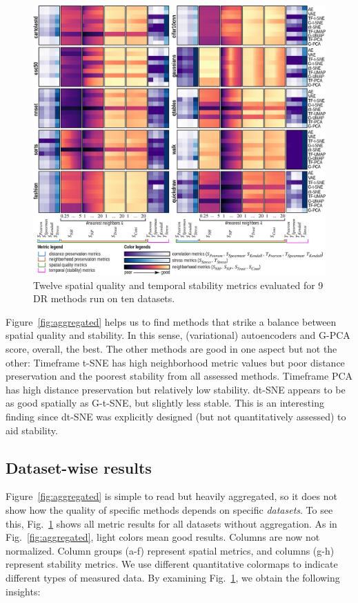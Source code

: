 \begin{figure}[tb]\centering
  \vspace{-0.2cm}
  \includegraphics[width=\linewidth]{figures/projection-evaluation/f2.eps}
  \caption{Twelve spatial quality and temporal stability metrics evaluated for 9 DR  methods run on ten datasets.}
  \vspace{-0.2cm}
  \label{fig:all_datasets}
\end{figure}


Figure~\ref{fig:aggregated} helps us to find methods that strike a balance between spatial quality and stability. In this sense, (variational) autoencoders and G-PCA score, overall, the best. The other methods are good in one aspect but not the other: Timeframe t-SNE has high neighborhood metric values but poor distance preservation and the poorest stability from all assessed methods. Timeframe PCA has high distance preservation but relatively low stability. dt-SNE appears to be as good spatially as G-t-SNE, but slightly less stable. This is an interesting finding since dt-SNE was explicitly designed (but not quantitatively assessed) to aid stability.

\subsection{Dataset-wise results}
%
Figure~\ref{fig:aggregated} is simple to read but heavily aggregated, so it does not show how the quality of specific methods depends on specific \emph{datasets}. To see this, Fig.~\ref{fig:all_datasets} shows all metric results for all datasets without aggregation. As in Fig.~\ref{fig:aggregated}, light colors mean good results. Columns are now not normalized. Column groups (a-f) represent spatial metrics, and columns (g-h) represent stability metrics. We use different quantitative colormaps to indicate different types of measured data. By examining Fig.~\ref{fig:all_datasets}, we obtain the following insights:\\

